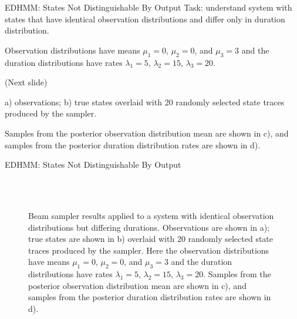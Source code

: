 \documentclass[xcolor=dvipsnames]{beamer}
\begin{document}
\begin{frame}[t]{EDHMM:  States Not Distinguishable By Output}
Task: understand system with states that have identical observation distributions and differ only in  duration distribution. \newline

Observation distributions have means $\mu_1 = 0$, $\mu_2 = 0$, and $\mu_3 = 3$ and the duration distributions have rates $\lambda_1 = 5$, $\lambda_2 = 15$, $\lambda_3 = 20$. \newline 

(Next slide) \newline 

a) observations; b) true states overlaid with 20 randomly selected state traces produced by the sampler.  \newline

Samples from the posterior observation distribution mean are shown in c), and samples from the posterior duration distribution rates are shown in d).
\end{frame}

\begin{frame}[t]{EDHMM:  States Not Distinguishable By Output}
\setcounter{subfigure}{0}
\begin{figure}
     \\
     \\
    \caption{Beam sampler results applied to a system with identical observation distributions but differing durations. Observations are shown in a); true states are shown in b) overlaid with 20 randomly selected state traces produced by the sampler. Here the observation distributions have means $\mu_1 = 0$, $\mu_2 = 0$, and $\mu_3 = 3$ and the duration distributions have rates $\lambda_1 = 5$, $\lambda_2 = 15$, $\lambda_3 = 20$. Samples from the posterior observation distribution mean are shown in c), and samples from the posterior duration distribution rates are shown in d).}
    \label{fig:experiment2_results}
\end{figure}
\end{frame}
\end{document}
